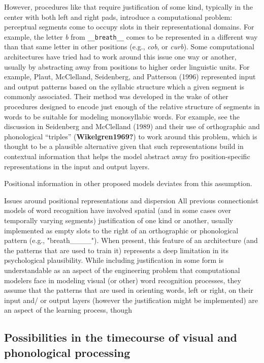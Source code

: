 \documentclass[
  american,
  man,floatsintext]{apa6}
\begin{document}
However, procedures like that require justification of some kind, typically in the center with both left and right pads, introduce a computational problem: perceptual segments come to occupy slots in their representational domains. For example, the letter \emph{b} from \texttt{\_\_breath\_\_} comes to be represented in a different way than that same letter in other positions (e.g., \emph{cob}, or \emph{curb}). Some computational architectures have tried had to work around this issue one way or another, usually by abstracting away from positions to higher order linguistic units. For example, Plaut, McClelland, Seidenberg, and Patterson (1996) represented input and output patterns based on the syllabic structure which a given segment is commonly associated. Their method was developed in the wake of other procedures designed to encode just enough of the relative structure of segments in words to be suitable for modeling monosyllabic words. For example, see the discussion in Seidenberg and McClelland (1989) and their use of orthographic and phonological ``triples'' (\textbf{Wikelgren1969?}) to work around this problem, which is thought to be a plausible alternative given that such representations build in contextual information that helps the model abstract away fro position-specific representations in the input and output layers.

Positional information in other proposed models deviates from this assumption.

Issues around positional representations and dispersion All previous connectionist models of word recognition have involved spatial (and in some cases over temporally varying segments) justification of one kind or another, usually implemented as empty slots to the right of an orthographic or phonological pattern (e.g., "breath\_\_\_\_"). When present, this feature of an architecture (and the patterns that are used to train it) represents a deep limitation in its psychological plausibility. While including justification in some form is understandable as an aspect of the engineering problem that computational modelers face in modeling visual (or other) word recognition processes, they assume that the patterns that are used in orienting words, left or right, on their input and/ or output layers (however the justification might be implemented) are an aspect of the learning process, though

\hypertarget{possibilities-in-the-timecourse-of-visual-and-phonological-processing}{%
\subsection{Possibilities in the timecourse of visual and phonological processing}\label{possibilities-in-the-timecourse-of-visual-and-phonological-processing}}
\end{document}
